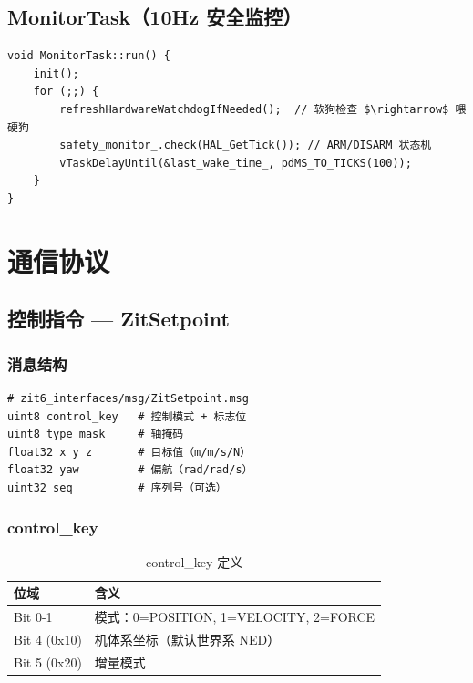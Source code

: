 \documentclass[12pt,a4paper]{article}
\begin{document}
\subsection{MonitorTask（10Hz 安全监控）}

\begin{lstlisting}[caption={MonitorTask 主循环}]
void MonitorTask::run() {
    init();
    for (;;) {
        refreshHardwareWatchdogIfNeeded();  // 软狗检查 $\rightarrow$ 喂硬狗
        safety_monitor_.check(HAL_GetTick()); // ARM/DISARM 状态机
        vTaskDelayUntil(&last_wake_time_, pdMS_TO_TICKS(100));
    }
}
\end{lstlisting}

\section{通信协议}

\subsection{控制指令 — ZitSetpoint}

\subsubsection{消息结构}

\begin{lstlisting}[caption={ZitSetpoint 消息定义}]
# zit6_interfaces/msg/ZitSetpoint.msg
uint8 control_key   # 控制模式 + 标志位
uint8 type_mask     # 轴掩码
float32 x y z       # 目标值（m/m/s/N）
float32 yaw         # 偏航（rad/rad/s）
uint32 seq          # 序列号（可选）
\end{lstlisting}

\subsubsection{control\_key}

\begin{table}[H]
\centering
\begin{tabularx}{\textwidth}{lX}
\toprule
\textbf{位域} & \textbf{含义} \\
\midrule
Bit 0-1 & 模式：0=POSITION, 1=VELOCITY, 2=FORCE \\
Bit 4 (0x10) & 机体系坐标（默认世界系 NED） \\
Bit 5 (0x20) & 增量模式 \\
\bottomrule
\end{tabularx}
\caption{control\_key 定义}
\end{table}
\end{document}
